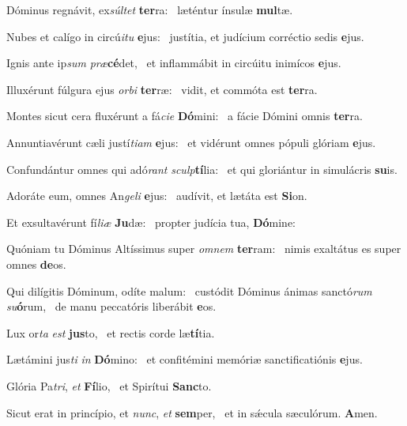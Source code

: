 \item Dóminus regnávit, ex\textit{súltet} \textbf{ter}ra:~\psstar{} læténtur ínsulæ \textbf{mul}tæ.
\item Nubes et calígo in circú\textit{itu} \textbf{e}jus:~\psstar{} justítia, et judícium corréctio sedis \textbf{e}jus.
\item Ignis ante ip\textit{sum} \textit{præ}\textbf{cé}det,~\psstar{} et inflammábit in circúitu inimícos \textbf{e}jus.
\item Illuxérunt fúlgura ejus \textit{orbi} \textbf{ter}ræ:~\psstar{} vidit, et commóta est \textbf{ter}ra.
\item Montes sicut cera fluxérunt a fá\textit{cie} \textbf{Dó}mini:~\psstar{} a fácie Dómini omnis \textbf{ter}ra.
\item Annuntiavérunt cæli justí\textit{tiam} \textbf{e}jus:~\psstar{} et vidérunt omnes pópuli glóriam \textbf{e}jus.
\item Confundántur omnes qui adó\textit{rant} \textit{sculp}\textbf{tí}lia:~\psstar{} et qui gloriántur in simulácris \textbf{su}is.
\item Adoráte eum, omnes An\textit{geli} \textbf{e}jus:~\psstar{} audívit, et lætáta est \textbf{Si}on.
\item Et exsultavérunt fí\textit{liæ} \textbf{Ju}dæ:~\psstar{} propter judícia tua, \textbf{Dó}mine:
\item Quóniam tu Dóminus Altíssimus super \textit{omnem} \textbf{ter}ram:~\psstar{} nimis exaltátus es super omnes \textbf{de}os.
\item Qui dilígitis Dóminum, odíte malum:~\pscross{} custódit Dóminus ánimas sanctó\textit{rum} \textit{su}\textbf{ó}rum,~\psstar{} de manu peccatóris liberábit \textbf{e}os.
\item Lux or\textit{ta} \textit{est} \textbf{jus}to,~\psstar{} et rectis corde læ\textbf{tí}tia.
\item Lætámini jus\textit{ti} \textit{in} \textbf{Dó}mino:~\psstar{} et confitémini memóriæ sanctificatiónis \textbf{e}jus.
\item Glória Pa\textit{tri}, \textit{et} \textbf{Fí}lio,~\psstar{} et Spirítui \textbf{Sanc}to.
\item Sicut erat in princípio, et \textit{nunc}, \textit{et} \textbf{sem}per,~\psstar{} et in sǽcula sæculórum. \textbf{A}men.
